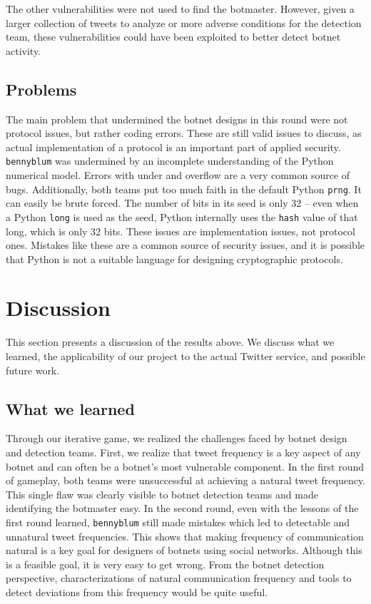 \documentclass[11pt, oneside]{article} %
\numberwithin{equation}{section} %
\numberwithin{figure}{section} %
\numberwithin{table}{section} %
\renewcommand{\c}[1]{\texttt{#1}}
\newcommand{\code}[1]{\c{#1}}
\newcommand{\teambb}{\c{bennyblum}}
\begin{document}
			The other vulnerabilities were not used to find the botmaster.  However, given a larger collection of tweets to analyze or more adverse conditions for the detection team, these vulnerabilities could have been exploited to better detect botnet activity.

	\subsection{Problems}
		The main problem that undermined the botnet designs in this round were not protocol issues, but rather coding errors. These are still valid issues to discuss, as actual implementation of a protocol is an important part of applied security. \teambb{} was undermined by an incomplete understanding of the Python numerical model. Errors with under and overflow are a very common source of bugs. Additionally, both teams put too much faith in the default Python \c{prng}. It can easily be brute forced. The number of bits in its seed is only 32 -- even when a Python \code{long} is used as the seed, Python internally uses the \c{hash} value of that long, which is only 32 bits. These issues are implementation issues, not protocol ones. Mistakes like these are a common source of security issues, and it is possible that Python is not a suitable language for designing cryptographic protocols.

\section{Discussion}
	This section presents a discussion of the results above. We discuss what we learned, the applicability of our project to the actual Twitter service, and possible future work.

	\subsection{What we learned}
		Through our iterative game, we realized the challenges faced by botnet design and detection teams. First, we realize that tweet frequency is a key aspect of any botnet and can often be a botnet's most vulnerable component. In the first round of gameplay, both teams were unsuccessful at achieving a natural tweet frequency. This single flaw was clearly visible to botnet detection teams and made identifying the botmaster easy. In the second round, even with the lessons of the first round learned, \teambb{} still made mistakes which led to detectable and unnatural tweet frequencies. This shows that making frequency of communication natural is a key goal for designers of botnets using social networks. Although this is a feasible goal, it is very easy to get wrong. From the botnet detection perspective, characterizations of natural communication frequency and tools to detect deviations from this frequency would be quite useful.
\end{document}
